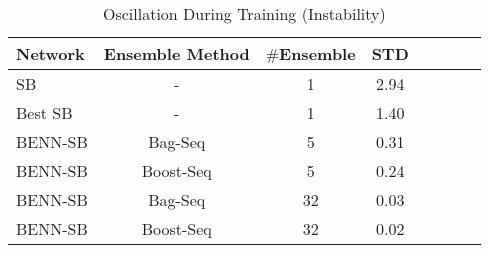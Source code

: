 \documentclass[10pt,twocolumn,letterpaper]{article}
\begin{document}
\begin{table}
    \vspace{-3mm}
        \caption{Oscillation During Training (Instability)}
        \centering
        \scriptsize
        \begin{tabular}{lccccccr}
            \toprule
            \toprule
            Network & Ensemble Method & $\#$Ensemble & STD\\
            \midrule
            \multirow{1}{1.2cm}{SB} & - & 1 & 2.94\\
            \hline
            \multirow{1}{1.2cm}{Best SB}  & - & 1 & 1.40 \\
            \hline
            \multirow{1}{1.2cm}{BENN-SB} & Bag-Seq & 5 & 0.31 \\
            \hline
            \multirow{1}{1.2cm}{BENN-SB} & Boost-Seq & 5 & 0.24 \\
            \hline
            \multirow{1}{1.2cm}{BENN-SB} & Bag-Seq & 32 & 0.03 \\
            \hline
            \multirow{1}{1.2cm}{BENN-SB} & Boost-Seq & 32 & 0.02 \\
            \hline

            \hline
            \bottomrule
        \end{tabular}
        \label{table:osci_tab}
        \vspace{-5mm}
\end{table}
\end{document}
